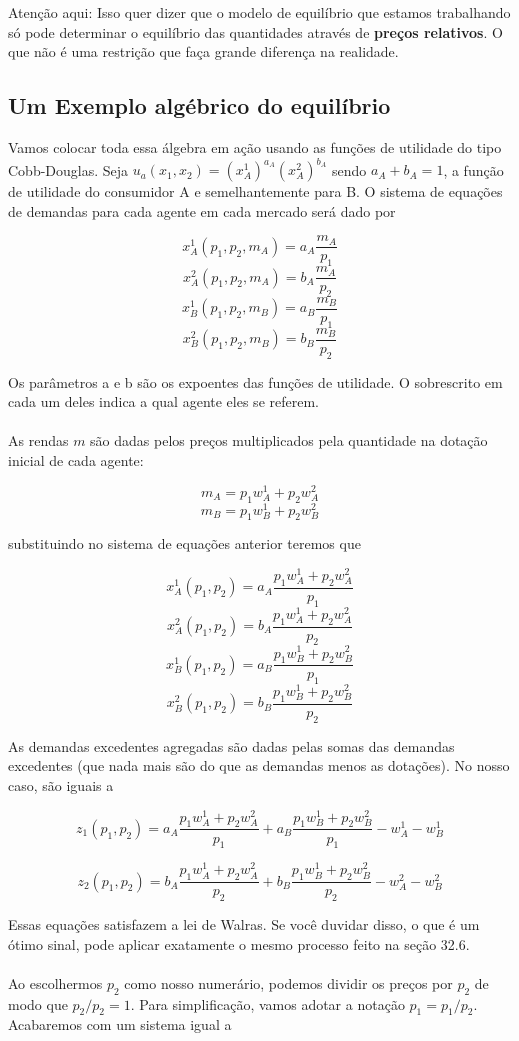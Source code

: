 \documentclass[a4paper,11pt,oneside]{book}
\theoremstyle{definition}
\theoremstyle{break}
\begin{document}
Atenção aqui: Isso quer dizer que o modelo de equilíbrio que estamos trabalhando só pode determinar o equilíbrio das quantidades através de \textbf{preços relativos}. O que não é uma restrição que faça grande diferença na realidade.

\subsection{Um Exemplo algébrico do equilíbrio}

Vamos colocar toda essa álgebra em ação usando as funções de utilidade do tipo Cobb-Douglas. Seja $u_a(x_1,x_2) = (x_A^1)^{a_A}(x_A^2)^{b_A}$ sendo $a_A + b_A = 1$, a função de utilidade do consumidor A e semelhantemente para B. O sistema de equações de demandas para cada agente em cada mercado será dado por

$$ x_A^1(p_1,p_2,m_A) = a_A \frac{m_A}{p_1} $$
$$ x_A^2(p_1,p_2,m_A) = b_A \frac{m_A}{p_2} $$
$$ x_B^1(p_1,p_2,m_B) = a_B \frac{m_B}{p_1} $$
$$ x_B^2(p_1,p_2,m_B) = b_B \frac{m_B}{p_2} $$

Os parâmetros a e b são os expoentes das funções de utilidade. O sobrescrito em cada um deles indica a qual agente eles se referem.
\\~\\
As rendas $m$ são dadas pelos preços multiplicados pela quantidade na dotação inicial de cada agente:

$$m_A = p_1w_A^1 + p_2w_A^2$$
$$m_B = p_1w_B^1 + p_2w_B^2$$

substituindo no sistema de equações anterior teremos que

$$ x_A^1(p_1,p_2) = a_A \frac{p_1w_A^1 + p_2w_A^2}{p_1} $$
$$ x_A^2(p_1,p_2) = b_A \frac{p_1w_A^1 + p_2w_A^2}{p_2} $$
$$ x_B^1(p_1,p_2) = a_B \frac{p_1w_B^1 + p_2w_B^2}{p_1} $$
$$ x_B^2(p_1,p_2) = b_B \frac{p_1w_B^1 + p_2w_B^2}{p_2} $$


As demandas excedentes agregadas são dadas pelas somas das demandas excedentes (que nada mais são do que as demandas menos as dotações). No nosso caso, são iguais a

$$z_1(p_1,p_2) = 
a_A \frac{p_1w_A^1 + p_2w_A^2}{p_1} + 
a_B \frac{p_1w_B^1 + p_2w_B^2}{p_1} - w_A^1 - w_B^1$$

$$z_2(p_1,p_2) = 
b_A \frac{p_1w_A^1 + p_2w_A^2}{p_2} + 
b_B \frac{p_1w_B^1 + p_2w_B^2}{p_2} - w_A^2 - w_B^2$$

Essas equações satisfazem a lei de Walras. Se você duvidar disso, o que é um ótimo sinal, pode aplicar exatamente o mesmo processo feito na seção 32.6.
\\~\\
Ao escolhermos $p_2$ como nosso numerário, podemos dividir os preços por $p_2$ de modo que $p_2/p_2 = 1$. Para simplificação, vamos adotar a notação $p_1 = p_1/p_2$. Acabaremos com um sistema igual a
\end{document}
